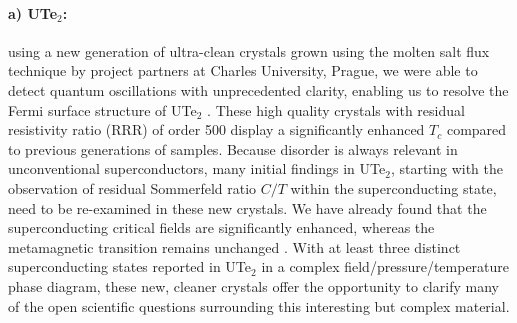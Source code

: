 \paragraph {a) UTe$_2$:} 
using a new generation of ultra-clean crystals grown using the molten salt flux technique by project partners at Charles University, Prague, we were able to detect quantum oscillations with unprecedented clarity, enabling us to resolve the Fermi surface structure of UTe$_2$ \cite{eaton23}. These high quality crystals with residual resistivity ratio (RRR) of order 500 display a significantly enhanced $T_c$ compared to previous generations of samples. Because disorder is always relevant in unconventional superconductors, many initial findings in UTe$_2$, starting with the observation of residual Sommerfeld ratio $C/T$ within the superconducting state, need to be re-examined in these new crystals. We have already found that the superconducting critical fields are significantly enhanced, whereas the metamagnetic transition remains unchanged \cite{wu23}. With at least three distinct superconducting states reported in UTe$_2$ in a complex field/pressure/temperature phase diagram, these new, cleaner crystals offer the opportunity to clarify many of the open scientific questions surrounding this interesting but complex material.




